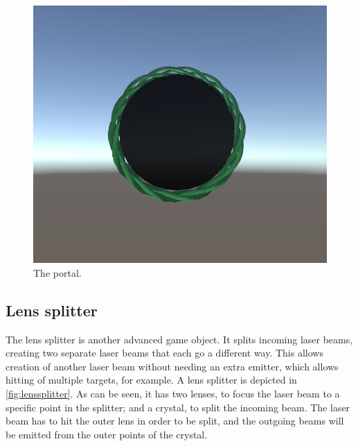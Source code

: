 			\begin{figure}[!ht]
				\centering
				\includegraphics[scale = 0.3]{Portal}
				\caption{The portal.}
				\label{fig:portal}
			\end{figure}
			
		\subsection{Lens splitter} \label{ssec:splitter}
			The lens splitter is another advanced game object. It splits incoming
			laser beams, creating two separate laser beams that each go
			a different way. This allows creation of another laser beam without
			needing an extra emitter, which allows hitting of multiple targets, for
			example. A lens splitter is depicted in \ref{fig:lenssplitter}. As
			can be seen, it has two lenses, to focus the laser beam to a specific 
			point in the splitter; and a crystal, to split the incoming beam. The 
			laser beam has to hit the outer lens in order to be split, and the 
			outgoing beams will be emitted from the outer points of the crystal.
			
